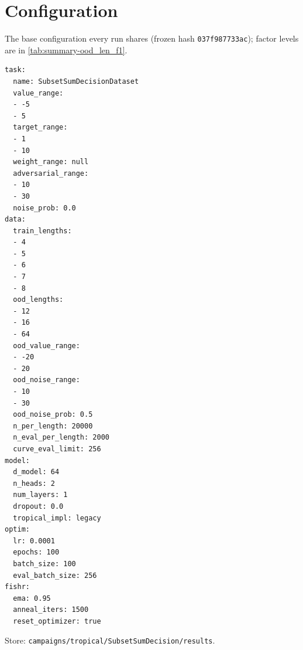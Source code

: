 \documentclass[10pt]{article}
\begin{document}
\section{Configuration}
The base configuration every run shares (frozen hash \texttt{037f987733ac}); factor levels are in \autoref{tab:summary-ood_len_f1}.
{\footnotesize
\begin{verbatim}
task:
  name: SubsetSumDecisionDataset
  value_range:
  - -5
  - 5
  target_range:
  - 1
  - 10
  weight_range: null
  adversarial_range:
  - 10
  - 30
  noise_prob: 0.0
data:
  train_lengths:
  - 4
  - 5
  - 6
  - 7
  - 8
  ood_lengths:
  - 12
  - 16
  - 64
  ood_value_range:
  - -20
  - 20
  ood_noise_range:
  - 10
  - 30
  ood_noise_prob: 0.5
  n_per_length: 20000
  n_eval_per_length: 2000
  curve_eval_limit: 256
model:
  d_model: 64
  n_heads: 2
  num_layers: 1
  dropout: 0.0
  tropical_impl: legacy
optim:
  lr: 0.0001
  epochs: 100
  batch_size: 100
  eval_batch_size: 256
fishr:
  ema: 0.95
  anneal_iters: 1500
  reset_optimizer: true
\end{verbatim}
}
Store: \texttt{campaigns/tropical/SubsetSumDecision/results}.
\end{document}
